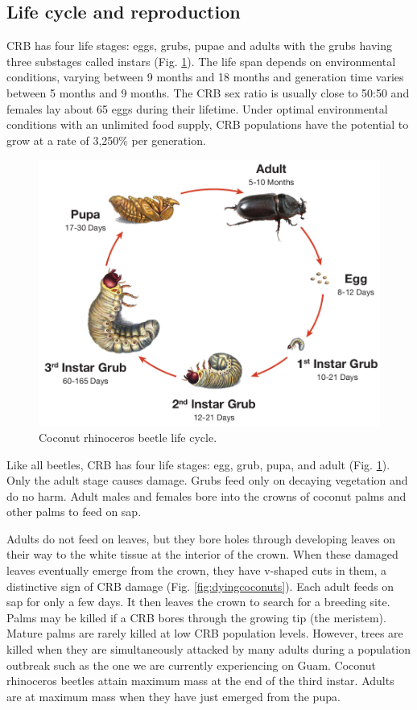 \documentclass[twocolumn,letterpaper]{scrartcl}
\begin{document}
\subsection{Life cycle and reproduction}
CRB has four life stages: eggs, grubs, pupae and adults with the grubs having three substages called instars (Fig. \ref{fig:crblifecycle}). The life span depends on environmental conditions, varying between 9 months and 18 months and generation time varies between 5 months and 9 months.
The CRB sex ratio is usually close to 50:50 and females lay about 65 eggs during their lifetime. Under optimal environmental conditions with an unlimited food supply, CRB populations have the potential to grow at a rate of 3,250\% per generation.

\begin{figure}[h!]
	\centering
	\includegraphics[width=\linewidth]{images/crb_life_cycle}
	\caption{Coconut rhinoceros beetle life cycle.}
	\label{fig:crblifecycle}
\end{figure}

Like all beetles, CRB has four life stages: egg, grub, pupa, and adult (Fig. \ref{fig:crblifecycle}). Only the adult stage causes damage. Grubs feed only on decaying vegetation and do no harm. Adult males and females bore into the crowns of coconut palms and other palms to feed on sap. 

Adults do not feed on leaves, but they bore holes through developing leaves on their way to the white tissue at the interior of the crown. When these damaged leaves eventually emerge from the crown, they have v-shaped cuts in them, a distinctive sign of CRB damage (Fig. \ref{fig:dyingcoconuts}). Each adult feeds on sap for only a few days. It then leaves the crown to search for a breeding site. Palms may be killed if a CRB bores through the growing tip (the meristem). Mature palms are rarely killed at low CRB population levels. However, trees are killed when they are simultaneously attacked by many adults during a population outbreak such as the one we are currently experiencing on Guam. Coconut rhinoceros beetles attain maximum mass at the end of the third instar. Adults are at maximum mass when they have just emerged from the pupa.
\end{document}
